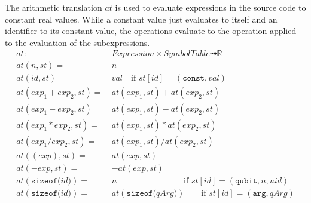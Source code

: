 The arithmetic translation $at$ is used to evaluate expressions in the source code to constant real values. While a constant value just evaluates to itself and an identifier to its constant value, the operations evaluate to the operation applied to the evaluation of the subexpressions.
\begin{align*}
    at : \ & Expression \times SymbolTable \dashrightarrow \mathbb{R}\\
    at(n, st) = \ & n\\
    at(id, st) = \ & val \quad \text{if } st[id] = (\texttt{const}, val)\\
    at(exp_1 + exp_2, st) = \ & at(exp_1, st) + at(exp_2, st)\\
    at(exp_1 - exp_2, st) = \ & at(exp_1, st) - at(exp_2, st)\\
    at(exp_1 * exp_2, st) = \ & at(exp_1, st) * at(exp_2, st)\\
    at(exp_1 / exp_2, st) = \ & at(exp_1, st) / at(exp_2, st)\\
    at((exp), st) = \ & at(exp, st)\\
    at(-exp, st) = \ & -at(exp, st)\\
    at(\texttt{sizeof(} id \texttt{)}) = \ & n \hspace{8em} \text{if } st[id] = (\texttt{qubit}, n, uid)\\
    at(\texttt{sizeof(} id \texttt{)}) = \ & at(\texttt{sizeof(} qArg \texttt{)}) \texttt \quad \quad \text{if } st[id] = (\texttt{arg}, qArg)
\end{align*}

